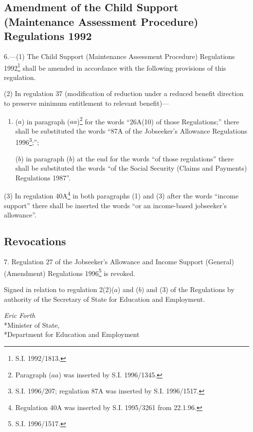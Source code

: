 \documentclass[12pt,a4paper]{article}
\begin{document}
\subsection[6. Amendment of the Child Support (Maintenance Assessment Procedure) Regulations 1992]{Amendment of the Child Support (Maintenance Assessment Procedure) Regulations 1992}

6.—(1) The Child Support (Maintenance Assessment Procedure) Regulations 1992\footnote{\frenchspacing S.I. 1992/1813.} shall be amended in accordance with the following provisions of this regulation.

(2) In regulation 37 (modification of reduction under a reduced benefit direction to preserve minimum entitlement to relevant benefit)—
\begin{enumerate}\item[]
($a$) in paragraph ($aa$)\footnote{\frenchspacing Paragraph ($aa$) was inserted by S.I. 1996/1345.} for the words “26A(10) of those Regulations;” there shall be substituted the words “87A of the Jobseeker’s Allowance Regulations 1996\footnote{\frenchspacing S.I. 1996/207; regulation 87A was inserted by S.I. 1996/1517.};”;

($b$) in paragraph ($b$) at the end for the words “of those regulations” there shall be substituted the words “of the Social Security (Claims and Payments) Regulations 1987”.
\end{enumerate}

(3) In regulation 40A\footnote{\frenchspacing Regulation 40A was inserted by S.I. 1995/3261 from 22.1.96.} in both paragraphs (1) and (3) after the words “income support” there shall be inserted the words “or an income-based jobseeker’s allowance”.

\subsection[7. Revocations]{Revocations}

7.  Regulation 27 of the Jobseeker’s Allowance and Income Support (General) (Amendment) Regulations 1996\footnote{\frenchspacing S.I. 1996/1517.} is revoked.

\bigskip

Signed in relation to regulation 2(2)($a$) and ($b$) and (3) of the Regulations by authority of the Secretary of State for Education and Employment.

{\raggedleft
\emph{Eric Forth}\\*Minister of State,\\*Department for Education and Employment

}
\end{document}
